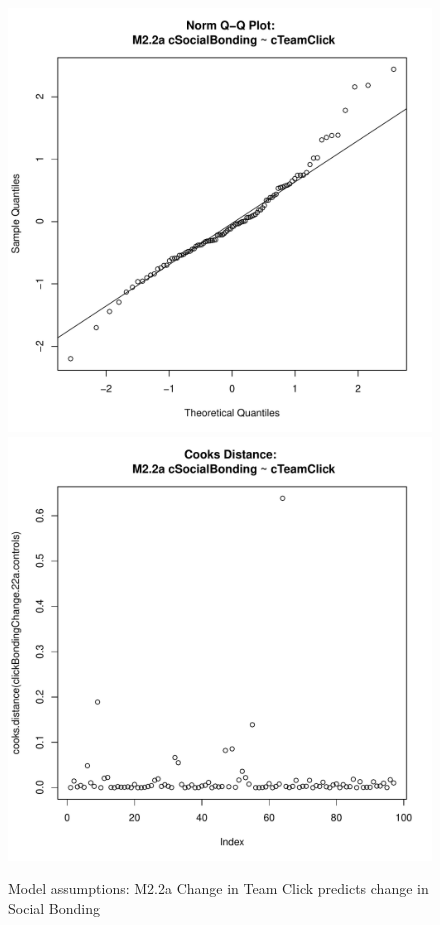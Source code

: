\begin{figure}[htbp]
        \includegraphics[scale =.4]{images/MLM22aQQNorm.pdf}
        \includegraphics[scale =.4]{images/MLM22aCooksD.pdf}
        \caption{Model assumptions: M2.2a Change in Team Click predicts change in Social Bonding}
        \label{fig:MLM22aAssumptions}
      \end{figure}







